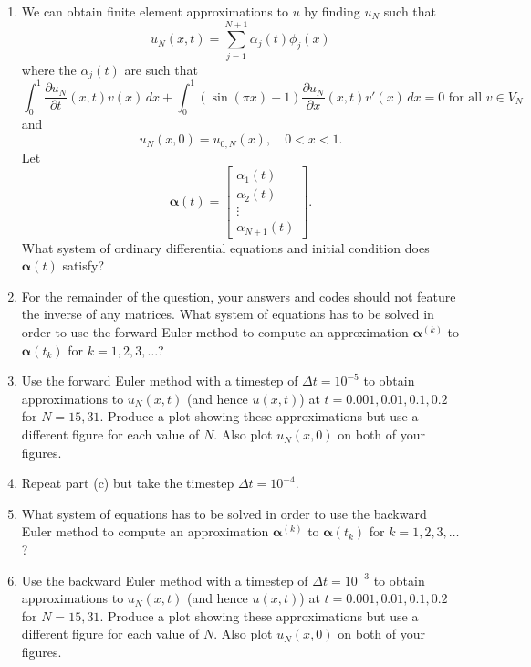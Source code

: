 \begin{enumerate}
\item We can obtain finite element approximations to $u$ by finding $u_N$ such that
\[
u_N(x,t)=\sum_{j=1}^{N+1}\alpha_j(t)\phi_j(x)
\]
where the $\alpha_j(t)$ are such that
\[
\int_0^1\frac{\partial u_N}{\partial t}(x,t)v(x)\,dx+\int_0^1(\sin(\pi x)+1)\frac{\partial u_N}{\partial x}(x,t)v'(x)\,dx=0\mbox{ for all }v\in V_N
\]
and
\[
u_N(x,0)=u_{0,N}(x),\quad 0<x<1.
\]
Let
\[
\boldsymbol{\alpha}(t)=\left[\begin{array}{c}\alpha_1(t) \\ \alpha_2(t) \\ \vdots \\ \alpha_{N+1}(t)\end{array}\right].
\]
What system of ordinary differential equations and initial condition does $\boldsymbol{\alpha}(t)$ satisfy?
\\
\item For the remainder of the question, your answers and codes should not feature the inverse of any matrices. What system of equations has to be solved in order to use the forward Euler method to compute an approximation $\boldsymbol{\alpha}^{(k)}$ to $\boldsymbol{\alpha}(t_k)$ for $k=1,2,3,\ldots$?
\\
\item Use the forward Euler method with a timestep of $\Delta t=10^{-5}$ to obtain approximations to $u_N(x,t)$ (and hence $u(x,t)$) at $t=0.001,0.01,0.1,0.2$ for $N=15,31$. Produce a plot showing these approximations but use a different figure for each value of $N$. Also plot $u_N(x,0)$ on both of your figures.
\\
\item Repeat part (c) but take the timestep $\Delta t=10^{-4}$.
\\
\item What system of equations has to be solved in order to use the backward Euler method to compute an approximation $\boldsymbol{\alpha}^{(k)}$ to $\boldsymbol{\alpha}(t_k)$ for $k=1,2,3,\ldots$?
\\
\item Use the backward Euler method with a timestep of $\Delta t=10^{-3}$ to obtain approximations to $u_N(x,t)$ (and hence $u(x,t)$) at $t=0.001,0.01,0.1,0.2$ for $N=15,31$. Produce a plot showing these approximations but use a different figure for each value of $N$. Also plot $u_N(x,0)$ on both of your figures.
\end{enumerate}




